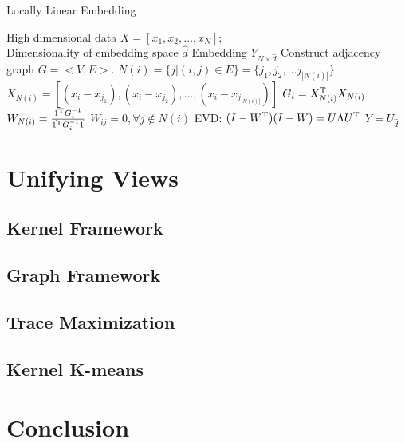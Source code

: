 \begin{algorithm}[htb]
	\caption{Locally Linear Embedding}
	\label{alg:lle}
	\begin{algorithmic}[1]
		\REQUIRE High dimensional data $X = [x_1, x_2, \ldots, x_N]$; \\
			Dimensionality of embedding space $ \hat{d} $
		\ENSURE Embedding $ Y_{N \times \hat{d}} $
		\STATE Construct adjacency graph $ G = <V, E> $.		
			\STATE $ N(i) = \{j | (i,j) \in E\} = \{ j_1,j_2, \ldots j_{|N(i)|}\} $
			\STATE $ X_{N(i)} =
			[(x_i - x_{j_1}), (x_i - x_{j_2}), \ldots, (x_i - x_{j_{|N(i)|}}) ] $
			\STATE $ G_i = X_{N(i)} ^\mathrm{T} X_{N(i)} $
			\STATE $ W_{N(i)} = \frac{\vec{1}^\mathrm{T} G_i^{-1}}{\vec{1}^\mathrm{T} G_i^{-1} \vec{1}} $
			\STATE $ W_{ij} = 0, \forall j \notin N(i) $
		\ENDFOR
		\STATE EVD: $ (I - W^\mathrm{T})(I - W) = U \Lambda U^\mathrm{T} $
		\STATE $ Y = U_{\hat{d}} $
	\end{algorithmic}
\end{algorithm}



\section{Unifying Views}
\label{sec:unify}

\subsection{Kernel Framework}
\label{sec:kfx}

\subsection{Graph Framework}
\label{sec:gfx}

\subsection{Trace Maximization}
\label{sec:trmax}

\subsection{Kernel K-means}
\label{sec:kkmean}

\section{Conclusion}
\label{sec:conclusion}


